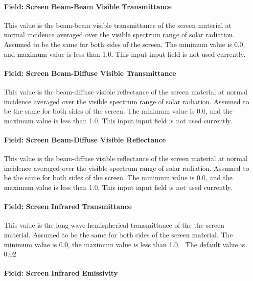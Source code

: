 \paragraph{Field: Screen Beam-Beam Visible Transmittance}\label{field-screen-beam-beam-visible-transmittance}

This value is the beam-beam visible transmittance of the screen material at normal incidence averaged over the visible spectrum range of solar radiation.~ Assumed to be the same for both sides of the screen. The minimum value is 0.0, and maximum value is less than 1.0. This input input field is not used currently.

\paragraph{Field: Screen Beam-Diffuse Visible Transmittance}\label{field-screen-beam-diffuse-visible-transmittance}

This value is the beam-diffuse visible reflectance of the screen material at normal incidence averaged over the visible spectrum range of solar radiation. Assumed to be the same for both sides of the screen. The minimum value is 0.0, and the maximum value is less than 1.0. This input input field is not used currently.

\paragraph{Field: Screen Beam-Diffuse Visible Reflectance}\label{field-screen-beam-diffuse-visible-reflectance}

This value is the beam-diffuse visible reflectance of the screen material at normal incidence averaged over the visible spectrum range of solar radiation. Assumed to be the same for both sides of the screen. The minimum value is 0.0, and the maximum value is less than 1.0. This input input field is not used currently.

\paragraph{Field: Screen Infrared Transmittance}\label{field-screen-infrared-transmittance}

This value is the long-wave hemispherical transmittance of the the screen material. Assumed to be the same for both sides of the screen material. The minimum value is 0.0, the maximum value is less than 1.0.~ The default value is 0.02

\paragraph{Field: Screen Infrared Emissivity}\label{field-screen-infrared-emissivity}

